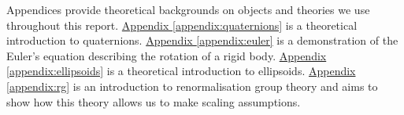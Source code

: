 \documentclass[class=report, float=false, crop=false]{standalone}
\begin{document}
Appendices provide theoretical backgrounds on objects and theories we use throughout this report. \hyperref[appendix:quaternions]{Appendix \ref{appendix:quaternions}} is a theoretical introduction to quaternions. \hyperref[appendix:euler]{Appendix \ref{appendix:euler}} is a demonstration of the Euler's equation describing the rotation of a rigid body. \hyperref[appendix:ellipsoids]{Appendix \ref{appendix:ellipsoids}} is a theoretical introduction to ellipsoids. \hyperref[appendix:rg]{Appendix \ref{appendix:rg}} is an introduction to renormalisation group theory and aims to show how this theory allows us to make scaling assumptions.

% 
\end{document}
